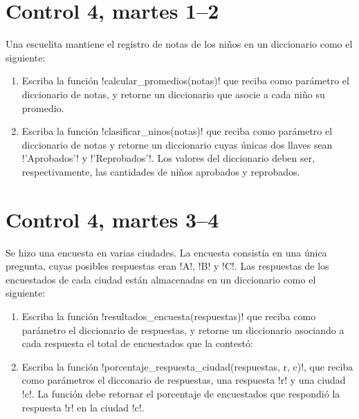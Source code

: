 \documentclass[12pt,spanish,a5paper,landscape]{article}
\begin{document}
  \part*{Control 4, martes 1--2}
  \newpage

  Una escuelita mantiene el registro de notas de los niños
  en un diccionario como el siguiente:
  

  \begin{enumerate}

    \item
      Escriba la función \li!calcular_promedios(notas)!
      que reciba como parámetro el diccionario de notas,
      y retorne un diccionario que asocie a cada niño su promedio.
      

    \item
      Escriba la función \li!clasificar_ninos(notas)!
      que reciba como parámetro el diccionario de notas
      y retorne un diccionario cuyas únicas dos llaves sean
      \li!'Aprobados'! y \li!'Reprobados'!.
      Los valores del diccionario deben ser, respectivamente,
      las cantidades de niños aprobados y reprobados.
      

  \end{enumerate}

  \newpage

  \part*{Control 4, martes 3--4}
  \newpage

  Se hizo una encuesta en varias ciudades.
  La encuesta consistía en una única pregunta,
  cuyas posibles respuestas eran \li!A!, \li!B! y \li!C!.
  Las respuestas de los encuestados de cada ciudad
  están almacenadas en un diccionario como el siguiente:
  

  \begin{enumerate}

    \item
      Escriba la función \li!resultados_encuesta(respuestas)!
      que reciba como parámetro el diccionario de respuestas,
      y retorne un diccionario asociando a cada respuesta
      el total de encuestados que la contestó:
      

    \item
      Escriba la función \li!porcentaje_respuesta_ciudad(respuestas, r, c)!,
      que reciba como parámetros el dicconario de respuestas,
      una respuesta \li!r! y una ciudad \li!c!.
      La función debe retornar el porcentaje de encuestados que respondió
      la respuesta \li!r! en la ciudad \li!c!.
      


  \end{enumerate}
\end{document}
